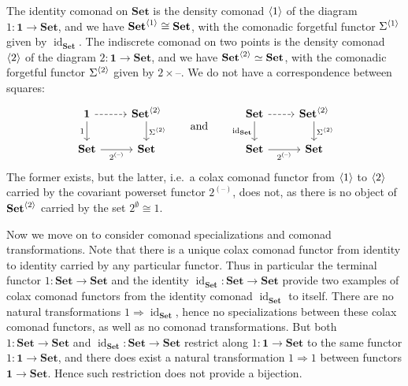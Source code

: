 \documentclass[11pt, oneside, article]{memoir}
\theoremstyle{plain}
\theoremstyle{definition}
\theoremstyle{remark}
\newenvironment{counterexample}
{\renewcommand\qedsymbol{$\lrcorner$}%
  \pushQED{\qed}\mycounterexample}
{\popQED\endmycounterexample}
\DeclareMathOperator{\id}{id}
\DeclarePairedDelimiter{\gen}{\langle}{\rangle}
\newcommand{\dash}{{\mathord{\text{--}}}}
\newcommand{\tn}[1]{\textnormal{#1}}
\newcommand{\Pow}[1]{2^{#1}}
\newcommand{\namedcat}[1]{\mathbf{#1}}
\newcommand{\Set}{\namedcat{Set}}
\newcommand{\CoalgOn}[2]{{#2}^{#1}}
\newcommand{\CoalgSet}[1]{\CoalgOn{#1}{\Set}}
\newcommand{\carr}{\Sigma}
\newcommand{\point}{\mathbf{1}}
\newcommand{\car}[1]{\carr^{#1}}
\newcommand{\idSet}{\id_\Set}
\newcommand{\hh}[2][]{#1 \tn{#2} #1}
\newcommand{\qqand}{\hh[\qquad]{and}}
\begin{document}
\begin{counterexample}
  The identity comonad on $\Set$ is the density comonad $\gen{1}$ of
  the diagram $1 \colon \point \to \Set$, and we have
  $\CoalgSet{\gen{1}} \cong \Set$, with the comonadic forgetful
  functor $\car{\gen{1}}$ given by $\idSet$. The indiscrete comonad on
  two points is the density comonad $\gen{2}$ of the diagram
  $2 \colon \point \to \Set$, and we have
  $\CoalgSet{\gen{2}} \simeq \Set$, with the comonadic forgetful
  functor $\car{\gen{2}}$ given by $2 \times \dash$. We do not
  have a correspondence between squares:
  \[
    \begin{tikzcd}
      \point & \CoalgSet{\gen{2}}\\
      \Set & \Set 
      \arrow["1"', from=1-1, to=2-1]
      \arrow[dashed, from=1-1, to=1-2]
      \arrow["\car{\gen{2}}", from=1-2, to=2-2]
      \arrow["\Pow{(\dash)}"', from=2-1, to=2-2]
    \end{tikzcd}
    \qqand
    \begin{tikzcd}
      \Set & \CoalgSet{\gen{2}} \\
      \Set & \Set
      \arrow["\idSet"', from=1-1, to=2-1]
      \arrow[dashed, from=1-1, to=1-2]
      \arrow["\car{\gen{2}}", from=1-2, to=2-2]
      \arrow["\Pow{(\dash)}"', from=2-1, to=2-2]
    \end{tikzcd}
  \]
  The former exists, but the latter, i.e.\ a colax comonad functor
  from $\gen{1}$ to $\gen{2}$ carried by the covariant powerset
  functor $\Pow{(\dash)}$, does not, as there is no object of
  $\CoalgSet{\gen{2}}$ carried by the set $\Pow{\emptyset} \cong 1$.

  Now we move on to consider comonad specializations and comonad
  transformations. Note that there is a unique colax comonad functor
  from identity to identity carried by any particular functor. Thus in
  particular the terminal functor $1 \colon \Set \to \Set$ and the
  identity $\idSet \colon \Set \to \Set$ provide two examples of colax
  comonad functors from the identity comonad $\idSet$ to itself. There
  are no natural transformations $1 \Rightarrow \idSet$, hence no
  specializations between these colax comonad functors, as well as no
  comonad transformations. But both $1 \colon \Set\to \Set$ and
  $\idSet \colon \Set\to \Set$ restrict along
  $1 \colon \point \to \Set$ to the same functor
  $1 \colon \point \to \Set$, and there does exist a natural
  transformation $1 \Rightarrow 1$ between functors $\point \to
  \Set$. Hence such restriction does not provide a bijection.
\end{counterexample}
\end{document}
